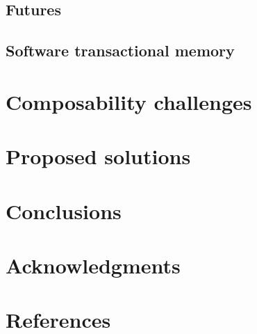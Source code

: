 \documentclass{sig-alternate}
\begin{document}
\subsection{Futures}

\subsection{Software transactional memory}

\section{Composability challenges}

\section{Proposed solutions}

\section{Conclusions}

\section{Acknowledgments}

\section{References}

\printbibliography[heading=none]
\end{document}

